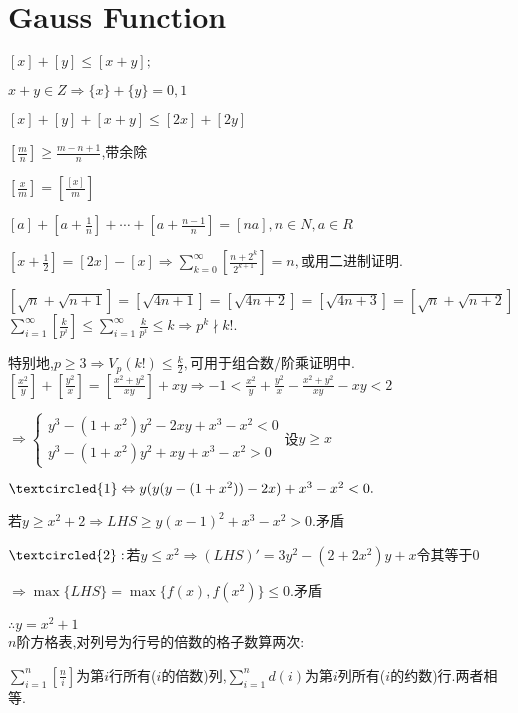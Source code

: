 \section{Gauss Function} 
$ [x]+[y]\le [x+y];$

$ x+y\in Z\Rightarrow \{x\}+\{y\}=0,1$

$[x]+[y]+[x+y]\le [2x]+[2y] $

$ [\frac{m}{n}]\ge \frac{m-n+1}{n} $,带余除

$ [\frac{x}{m}]=[\frac{[x]}{m}]$

$ [a]+[a+\frac{1}{n}]+\cdots+[a+\frac{n-1}{n}]=[na],n\in N,a \in R$

$ [x+\frac{1}{2}]=[2x]-[x]\Rightarrow \sum_{k=0}^{\infty}{[\frac{n+2^k}{2^{k+1}}]}=n,$或用二进制证明.

$ [\sqrt{n}+\sqrt{n+1}]=[\sqrt{4n+1}]=[\sqrt{4n+2}]=[\sqrt{4n+3}]=[\sqrt{n}+\sqrt{n+2}]$
\\

$ \sum_{i=1}^{\infty}{[\frac{k}{p^i}]}\le \sum_{i=1}^{\infty}{\frac{k}{p^i}}\le k\Rightarrow p^k \nmid k!.$

特别地,$ p\ge 3\Rightarrow V_p(k!)\le \frac{k}{2},$可用于组合数/阶乘证明中.
\\

$ [\frac{x^2}{y}]+[\frac{y^2}{x}]=[\frac{x^2+y^2}{xy}]+xy\Rightarrow -1<\frac{x^2}{y}+\frac{y^2}{x}-\frac{x^2+y^2}{xy}-xy<2$

$ \Rightarrow \left\{ \begin{matrix} y^3-(1+x^2)y^2-2xy+x^3-x^2<0 \\ y^3-(1+x^2)y^2+xy+x^3-x^2>0 \end{matrix} \right. $设$ y\ge x$

$ \textcircled{1}\Leftrightarrow y(y(y-(1+x^2))-2x)+x^3-x^2<0.$

若$ y\ge x^2+2\Rightarrow LHS\ge y(x-1)^2+x^3-x^2>0$.矛盾

$ \textcircled{2}:$若$ y\le x^2\Rightarrow (LHS)'=3y^2-(2+2x^2)y+x $令其等于$ 0$ 

$\Rightarrow \max\{LHS\}=\max\{f(x),f(x^2)\}\le 0$.矛盾

$ \therefore y=x^2+1$
\\

$ n$阶方格表,对列号为行号的倍数的格子数算两次:

$ \sum_{i=1}^{n}{[\frac{n}{i}]}$为第$ i$行所有($ i$的倍数)列,$ \sum_{i=1}^{n}{d(i)}$为第$ i$列所有($ i$的约数)行.两者相等.

